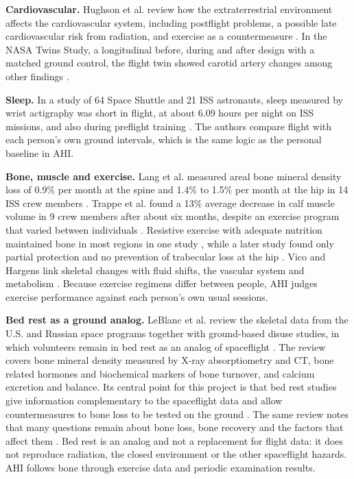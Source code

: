 \medskip\noindent\textbf{Cardiovascular.} Hughson et al. review how the extraterrestrial environment affects the cardiovascular system, including postflight problems, a possible late cardiovascular risk from radiation, and exercise as a countermeasure \cite{hughson2018heart}. In the NASA Twins Study, a longitudinal before, during and after design with a matched ground control, the flight twin showed carotid artery changes among other findings \cite{garrettbakelman2019twins}.

\medskip\noindent\textbf{Sleep.} In a study of 64 Space Shuttle and 21 ISS astronauts, sleep measured by wrist actigraphy was short in flight, at about 6.09 hours per night on ISS missions, and also during preflight training \cite{barger2014sleep}. The authors compare flight with each person's own ground intervals, which is the same logic as the personal baseline in AHI.

\medskip\noindent\textbf{Bone, muscle and exercise.} Lang et al. measured areal bone mineral density loss of 0.9\% per month at the spine and 1.4\% to 1.5\% per month at the hip in 14 ISS crew members \cite{lang2004bone}. Trappe et al. found a 13\% average decrease in calf muscle volume in 9 crew members after about six months, despite an exercise program that varied between individuals \cite{trappe2009exercise}. Resistive exercise with adequate nutrition maintained bone in most regions in one study \cite{smith2012bone}, while a later study found only partial protection and no prevention of trabecular loss at the hip \cite{sibonga2019resistive}. Vico and Hargens link skeletal changes with fluid shifts, the vascular system and metabolism \cite{vico2018skeletal}. Because exercise regimens differ between people, AHI judges exercise performance against each person's own usual sessions.

\medskip\noindent\textbf{Bed rest as a ground analog.} LeBlanc et al. review the skeletal data from the U.S. and Russian space programs together with ground-based disuse studies, in which volunteers remain in bed rest as an analog of spaceflight \cite{leblanc2007skeletal}. The review covers bone mineral density measured by X-ray absorptiometry and CT, bone related hormones and biochemical markers of bone turnover, and calcium excretion and balance. Its central point for this project is that bed rest studies give information complementary to the spaceflight data and allow countermeasures to bone loss to be tested on the ground \cite{leblanc2007skeletal}. The same review notes that many questions remain about bone loss, bone recovery and the factors that affect them \cite{leblanc2007skeletal}. Bed rest is an analog and not a replacement for flight data: it does not reproduce radiation, the closed environment or the other spaceflight hazards. AHI follows bone through exercise data and periodic examination results.

